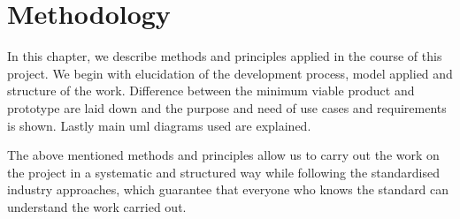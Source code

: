 \section{Methodology} \label{sec:methodology}

In this chapter, we describe methods and principles applied in the course of this project. We begin with elucidation of the development process, model applied and structure of the work. Difference between the minimum viable product and prototype are laid down and the purpose and need of use cases and requirements is shown. Lastly main \acrshort{uml} diagrams used are explained.








\bigskip\noindent
The above mentioned methods and principles allow us to carry out the work on the project in a systematic and structured way while following the standardised industry approaches, which guarantee that everyone who knows the standard can understand the work carried out.